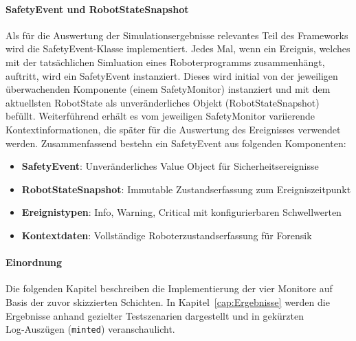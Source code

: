 \paragraph{SafetyEvent und RobotStateSnapshot}
Als für die Auswertung der Simulationsergebnisse relevantes Teil des Frameworks
wird die SafetyEvent-Klasse implementiert. Jedes Mal, wenn ein Ereignis,
welches mit der tatsächlichen Simluation eines Roboterprogramms zusammenhängt,
auftritt, wird ein SafetyEvent instanziert. Dieses wird initial von der
jeweiligen überwachenden Komponente (einem SafetyMonitor) instanziert und mit
dem aktuellsten RobotState als unveränderliches Objekt
(RobotStateSnapshot) befüllt.
Weiterführend erhält es vom jeweiligen SafetyMonitor variierende
Kontextinformationen, die später für die Auswertung des Ereignisses verwendet
werden. Zusammenfassend bestehn ein SafetyEvent aus folgenden Komponenten:
\begin{itemize}
  \item \textbf{SafetyEvent}: Unveränderliches Value Object für
    Sicherheitsereignisse
  \item \textbf{RobotStateSnapshot}: Immutable Zustandserfassung zum
    Ereigniszeitpunkt
  \item \textbf{Ereignistypen}: Info, Warning, Critical mit
    konfigurierbaren Schwellwerten
  \item \textbf{Kontextdaten}: Vollständige Roboterzustandserfassung
    für Forensik
\end{itemize}

\paragraph{Einordnung}
Die folgenden Kapitel beschreiben die Implementierung der vier
Monitore auf Basis
der zuvor skizzierten Schichten. In Kapitel~\ref{cap:Ergebnisse} werden die
Ergebnisse anhand gezielter Testszenarien dargestellt und in gekürzten
Log‑Auszügen (\texttt{minted}) veranschaulicht.
